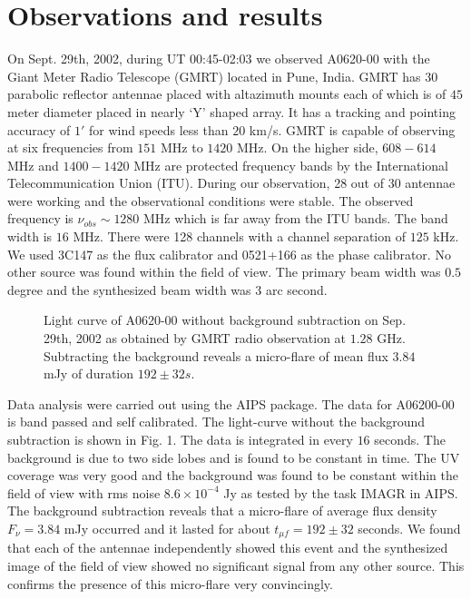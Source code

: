 \documentclass[referee]{cjaa}           %
\begin{document}
\section{Observations and results}
\label{sect:Obs}
On Sept. 29th, 2002, during UT 00:45-02:03 we observed A0620-00 with the Giant Meter Radio
Telescope (GMRT) located in Pune, India. GMRT has $30$ parabolic reflector antennae placed with altazimuth
mounts each of which is of $45$ meter diameter placed in nearly `Y' shaped array. It has a tracking 
and pointing accuracy of $1'$ for wind speeds less than $20$ km/s. 
GMRT is capable of observing at six frequencies from $151$ MHz to $1420$ MHz.
On the higher side, $608-614$ MHz and $1400-1420$ MHz are protected frequency bands
by the International Telecommunication Union (ITU).
During our observation, 28 out of 30 antennae
were working and the observational conditions were stable. 
The observed frequency is $\nu_{obs} \sim 1280$ MHz which is far away from the ITU bands.
The band width is $16$ MHz. There were 128 channels with  
a channel separation of $125$ kHz.
We used 3C147 as the flux calibrator and 0521+166 as the phase calibrator.
No other source was found within the field of view. The primary beam width was 
$0.5$ degree and the synthesized beam width was $3$ arc second.
\begin{figure}
   \begin{center}
   \mbox{\textwidth{}\textwidth{}}
   \caption{Light curve of A0620-00 without background subtraction on Sep. 29th, 
2002 as obtained by GMRT radio observation at $1.28$ GHz. Subtracting 
the background reveals a micro-flare of mean flux $3.84$ mJy of duration $192 \pm 32 s$.}
   \end{center}
\end{figure}

Data analysis were carried out using the AIPS package. 
The data for A06200-00 is band passed and self calibrated.
The light-curve without the background subtraction is shown in Fig. 1.
The data is integrated in every $16$ seconds. The background is
due to two side lobes and is found to be constant in time.
The UV coverage was very good and the background was found to be constant
within the field of view with rms noise $8.6 \times 10^{-4}$ Jy as tested by the task IMAGR in AIPS.
The background subtraction reveals that a micro-flare
of average flux density $F_\nu=3.84$ mJy occurred and it lasted for
about $t_{\mu f} = 192 \pm 32$ seconds.
We found that each of the antennae independently showed this event
and the synthesized image of the field of view showed no significant signal 
from any other source. 
This confirms the presence of this micro-flare very convincingly.
\end{document}

